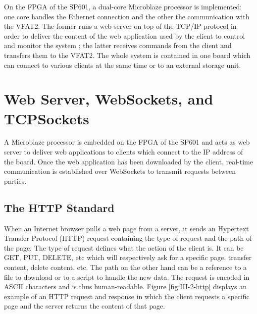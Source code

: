     On the FPGA of the SP601, a dual-core Microblaze processor is implemented: one core handles the Ethernet connection and the other the communication with the VFAT2. The former runs a web server on top of the TCP/IP protocol in order to deliver the content of the web application used by the client to control and monitor the system ; the latter receives commands from the client and transfers them to the VFAT2. The whole system is contained in one board which can connect to various clients at the same time or to an external storage unit.

  \section{Web Server, WebSockets, and TCPSockets}

    A Microblaze processor is embedded on the FPGA of the SP601 and acts as web server to deliver web applications to clients which connect to the IP address of the board. Once the web application has been downloaded by the client, real-time communication is established over WebSockets to transmit requests between parties.

    \subsection{The HTTP Standard}

      When an Internet browser pulls a web page from a server, it sends an Hypertext Transfer Protocol (HTTP) request containing the type of request and the path of the page. The type of request defines what the action of the client is. It can be GET, PUT, DELETE, etc which will respectively ask for a specific page, transfer content, delete content, etc. The path on the other hand can be a reference to a file to download or to a script to handle the new data. The request is encoded in ASCII characters and is thus human-readable. Figure \ref{fig:III-2-http} displays an example of an HTTP request and response in which the client requests a specific page and the server returns the content of that page. \\

